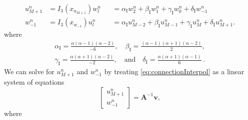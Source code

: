 \documentclass[dvipsnames]{article}
\begin{document}
\begin{equation}\label{eq:connectionInterpol}
    \begin{aligned}
        u_{M+1}^n &= I_3(x_{u_{M+1}})w_l^n &&= \alpha_\text{I}w_2^n + \beta_\text{I}w_1^n + \gamma_\text{I}w_0^n + \delta_\text{I} w_{-1}^n\\
        w_{-1}^n &= I_3(x_{w_{-1}})u_l^n &&=\alpha_\text{I} u_{M-2}^n + \beta_\text{I}u_{M-1}^n+ \gamma_\text{I}u_M^n + \delta_\text{I} u_{M+1}^n.
    \end{aligned}
\end{equation}
where
\begin{gather*}
    \alpha_\text{I} = \frac{\alpha(\alpha - 1)(\alpha - 2)}{-6}, \quad \beta_\text{I} = \frac{(\alpha - 1)(\alpha + 1)(\alpha - 2)}{2},\\
    \gamma_\text{I} = \frac{\alpha(\alpha + 1)(\alpha - 2)}{-2}, \quad \text{and} \quad\delta_\text{I} = \frac{\alpha(\alpha + 1)(\alpha - 1)}{6}\,.
\end{gather*}
We can solve for $u_{M+1}^n$ and $w_{-1}^n$ by treating \eqref{eq:connectionInterpol} as a linear system of equations
\begin{equation}\label{eq:matSolution}
    \begin{bmatrix}
    u_{M+1}^n \\
    w_{-1}^n
    \end{bmatrix}
    =
    \mathbf{A}^{-1}
    \mathbf{v},
\end{equation}
where
\end{document}

